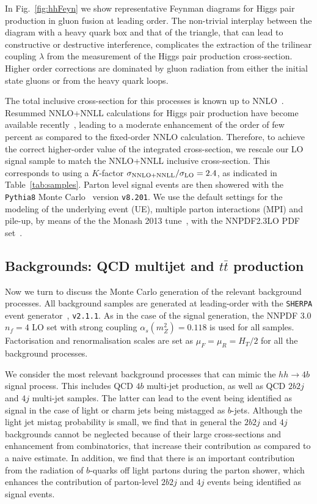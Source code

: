 In Fig.~\ref{fig:hhFeyn} we show representative Feynman diagrams
    for Higgs pair production in gluon fusion at
    leading order.
    The non-trivial interplay between the diagram with a heavy quark box
    and that of the triangle, that can lead to constructive or destructive interference,
    complicates the extraction of
    the trilinear coupling
    $\lambda$ from the measurement of the Higgs pair
    production cross-section.
    Higher order corrections are dominated by gluon radiation
    from either the initial state gluons or from the heavy quark loops.

    The total inclusive cross-section for this processes is
    known up to NNLO~\cite{deFlorian:2013jea}.
Resummed NNLO+NNLL calculations for Higgs pair production have become available recently~\cite{deFlorian:2015moa},
leading to a moderate enhancement of the order of
few percent as compared to the fixed-order NNLO calculation.
%
Therefore, to achieve the correct higher-order value of the  integrated cross-section, we rescale our LO signal sample to match the
NNLO+NNLL
inclusive cross-section.
%
This corresponds to using a $K$-factor $\sigma_{\rm NNLO+NNLL}/\sigma_{\rm LO}=2.4$, as indicated
in Table~\ref{tab:samples}.
%
Parton level signal events are then showered with the {\tt Pythia8} Monte
Carlo~\cite{Sjostrand:2007gs,Sjostrand:2014zea} version {\tt v8.201}.
%
We use the default settings for the modeling
of the underlying event (UE), multiple parton
interactions (MPI) and pile-up, by means
of the the Monash 2013 tune~\cite{Skands:2014pea},
with the NNPDF2.3LO PDF set~\cite{Ball:2012cx}.
%


\subsection{Backgrounds: QCD multijet and $t\bar{t}$ production}

Now we turn to discuss the Monte Carlo generation of the relevant background processes.
%
All background samples are generated at leading-order
with the {\tt SHERPA} event generator~\cite{Gleisberg:2008ta}, {\tt v2.1.1}.
%
As in the case of the signal generation,
the NNPDF 3.0 $n_f = 4$ LO set with strong coupling
$\alpha_s(m_Z^2)=0.118$ is used for all samples.
%
Factorisation and renormalisation scales are set as $\mu_F=\mu_R=H_T/2$ for all
the background processes.

We consider the most relevant background
processes that can mimic the
 $hh\to 4b$ signal process.
%
This includes  QCD $4b$ multi-jet production, as well as
QCD $2b2j$ and $4j$ multi-jet samples.
%
The latter can lead to the event being identified
as signal in the case of light or charm
jets being mistagged as $b$-jets.
%
Although the light jet mistag probability is small, we find that
in general the $2b2j$ and $4j$ backgrounds cannot be neglected because
of their large cross-sections and enhancement from combinatorics, that
increase their contribution as compared to a naive estimate.
%
In addition, we find that there is an important contribution from the radiation
of $b$-quarks off light partons during the parton shower, which enhances the contribution
of parton-level $2b2j$ and $4j$ events being identified as signal events.
%


